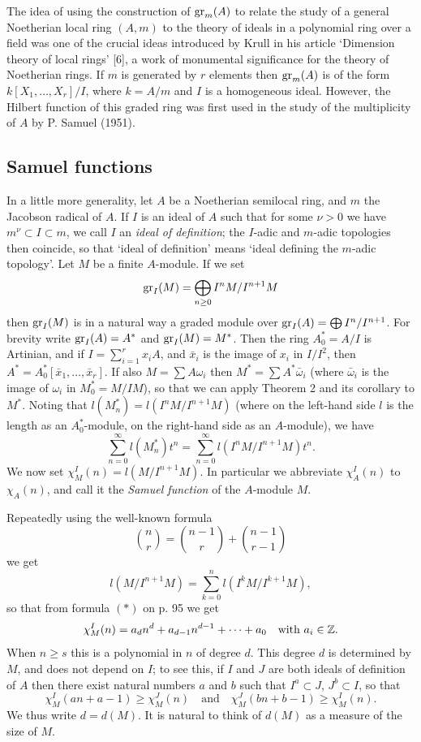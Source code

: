 The idea of using the construction of $\operatorname{gr}_m(A)$ to relate the study of a
general Noetherian local ring $(A, m)$ to the theory of ideals in a polynomial
ring over a field was one of the crucial ideas introduced by Krull in his
article `Dimension theory of local rings' [6], a work of monumental
significance for the theory of Noetherian rings. If $m$ is generated by $r$
elements then $\operatorname{gr}_m(A)$ is of the form $k[X_1, \ldots, X_r]/I$, where $k = A/m$ and $I$ is a
homogeneous ideal. However, the Hilbert function of this graded ring was
first used in the study of the multiplicity of $A$ by P. Samuel (1951).

\subsection*{Samuel functions}

In a little more generality, let $A$ be a Noetherian semilocal ring, and $m$
the Jacobson radical of $A$. If $I$ is an ideal of $A$ such that for some $\nu > 0$
we have $m^\nu \subset I \subset m$, we call $I$ an \emph{ideal of definition}; the $I$-adic and $m$-adic
topologies then coincide, so that `ideal of definition' means `ideal defining
the $m$-adic topology'. Let $M$ be a finite $A$-module. If we set
\[
  \operatorname{gr}_I(M) = \bigoplus_{n \ge 0} I^nM/I^{n+1}M
\]
then $\operatorname{gr}_I(M)$ is in a natural way a graded module over $\operatorname{gr}_I(A) = \bigoplus I^n/I^{n+1}$.
For brevity write $\operatorname{gr}_I(A) = A^*$ and $\operatorname{gr}_I(M) = M^*$. Then the ring $A^*_0 = A/I$ is
Artinian, and if $I = \sum_{i=1}^{r} x_iA$, and $\bar{x}_i$ is the image of $x_i$ in $I/I^2$, then
$A^* = A^*_0[\bar{x}_1, \ldots, \bar{x}_r]$. If also $M = \sum A\omega_i$ then $M^* = \sum A^*\bar{\omega}_i$ (where $\bar{\omega}_i$ is the
image of $\omega_i$ in $M_0^* = M/IM$), so that we can apply Theorem 2 and its
corollary to $M^*$. Noting that $l(M_n^*) = l(I^nM/I^{n+1}M)$ (where on the left-hand
side $l$ is the length as an $A^*_0$-module, on the right-hand side as an $A$-module),
we have
\[
  \sum_{n=0}^{\infty} l(M_n^*)t^n = \sum_{n=0}^{\infty} l(I^nM/I^{n+1}M)t^n.
\]
We now set $\chi_M^I(n) = l(M/I^{n+1}M)$. In particular we abbreviate $\chi_A^I(n)$ to
$\chi_A(n)$, and call it the \emph{Samuel function} of the $A$-module $M$.

Repeatedly using the well-known formula
\[
  \binom{n}{r} = \binom{n-1}{r} + \binom{n-1}{r-1}
\]
we get
\[
  l(M/I^{n+1}M) = \sum_{k=0}^{n} l(I^kM/I^{k+1}M),
\]
so that from formula $(*)$ on p. 95 we get
\[
  \chi_M^I(n) = a_dn^d + a_{d-1}n^{d-1} + \cdots + a_0 \quad \text{with } a_i \in \mathbb{Z}.
\]
When $n \ge s$ this is a polynomial in $n$ of degree $d$. This degree $d$ is determined by $M$, and does not depend on $I$; to see this, if $I$ and $J$ are
both ideals of definition of $A$ then there exist natural numbers $a$ and $b$
such that $I^a \subset J$, $J^b \subset I$, so that
\[
  \chi_M^I(an + a - 1) \ge \chi_M^J(n) \quad \text{and} \quad \chi_M^J(bn + b - 1) \ge \chi_M^I(n).
\]
We thus write $d = d(M)$. It is natural to think of $d(M)$ as a measure of the size
of $M$.

